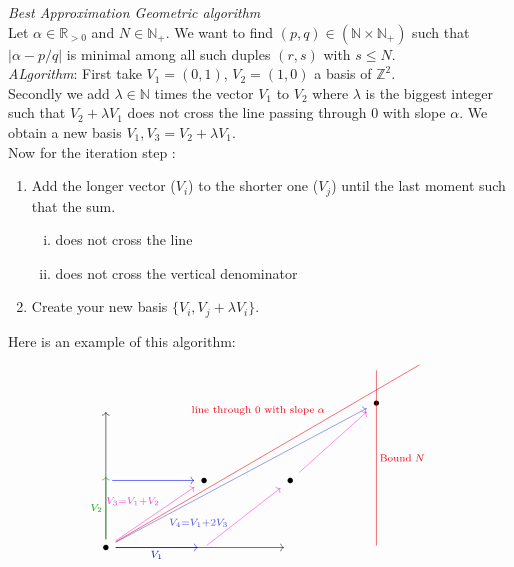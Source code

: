 \documentclass[a4paper,11pt,american]{article}
\newcommand{\N}{\mathbb{N}}
\newcommand{\R}{\mathbb{R}}
\newcommand{\Z}{\mathbb{Z}}
\theoremstyle{plain}
\theoremstyle{definition}
\begin{document}
\emph{Best Approximation Geometric algorithm}\\
Let $\alpha\in\R_{>0}$ and $N\in \N_+$. We want to find $(p,q)\in(\N\times\N_+)$ such that $\vert \alpha-p/q\vert$ is minimal among all such duples $(r,s)$ with $s\leq N$.\\
\emph{ ALgorithm}: First take $V_1=(0,1)$, $V_2=(1,0)$ a basis of $\Z^2$.\\
Secondly we add $\lambda\in \N$ times the vector $V_1$ to $V_2$ where $\lambda$ is the biggest integer such that $V_2+\lambda V_1$ does not cross the line passing through $0$ with slope $\alpha$. We obtain a new basis $V_1,V_3=V_2+\lambda V_1$.\\
Now for the iteration step :
\begin{enumerate}
    \item Add the longer vector ($V_i$) to the shorter one ($V_j$) until the last moment such that the sum.
    \begin{enumerate}[i)]
    \item does not cross the line
    \item \label{ii} does not cross the vertical denominator
\end{enumerate}
\item Create your new basis $\{V_i,V_j+\lambda V_i\}$.
\end{enumerate}
Here is an example of this algorithm:
\[\begin{tikzcd}
	&&&&&& {} & {} \\
	{} &&&&&& \bullet \\
	&&&&&& {} \\
	{} && \bullet && \bullet \\
	\\
	\bullet & {} & {} && {} && {}
	\arrow[""{name=0, anchor=center, inner sep=0}, from=6-1, to=2-1]
	\arrow[color={rgb,255:red,0;green,8;blue,235}, from=4-1, to=4-3]
	\arrow["{V_1}"', color={rgb,255:red,0;green,8;blue,235}, from=6-1, to=6-3]
	\arrow["{V_3=V_1+V_2}"{pos=0.6}, color={rgb,255:red,255;green,51;blue,235}, from=6-1, to=4-3]
	\arrow[color={rgb,255:red,255;green,51;blue,235}, from=6-3, to=4-5]
	\arrow[color={rgb,255:red,255;green,51;blue,235}, from=4-5, to=2-7]
	\arrow["{\text{line through 0 with slope}\; \alpha}"{pos=0.7}, color={rgb,255:red,233;green,1;blue,17}, no head, from=6-1, to=1-8]
	\arrow["{V_4=V_1+2V_3}"'{pos=0.2}, color={rgb,255:red,79;green,79;blue,227}, from=6-1, to=2-7]
	\arrow[from=6-1, to=6-5]
	\arrow["{\text{Bound}\; N}", color={rgb,255:red,233;green,1;blue,17}, no head, from=1-7, to=6-7]
	\arrow["{V_2}", color={rgb,255:red,4;green,169;blue,4}, from=6-1, to=0]
\end{tikzcd}\]
\end{document}
